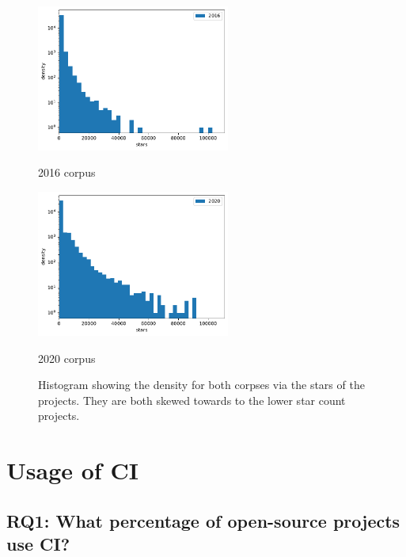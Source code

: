\documentclass[10pt,conference]{IEEEtran}
\begin{document}
\begin{figure}[!htbp]
  \centering
  \begin{minipage}{.48\textwidth}
    \centering
    \includegraphics[width=2.5in]{../src/results/density_2016.pdf}
    \caption[]{2016 corpus}
    \label{graph:hist2016}
  \end{minipage}
  \begin{minipage}{.48\textwidth}
    \centering
  \includegraphics[width=2.5in]{../src/results/density_2020.pdf}
  \caption[]{2020 corpus}
  \label{graph:hist2020}
  \end{minipage}
  \caption[]{Histogram showing the density for both corpses via the stars of the projects. They are both skewed towards to the lower star count projects. }
  \label{graph:hist}

\end{figure}




\pagebreak
\section{Usage of CI}

\vspace*{-0.05in}
\subsection{\textbf{RQ1}: What percentage of open-source projects use CI?}
\label{section:RQ1}
\vspace*{-0.05in}
\end{document}
